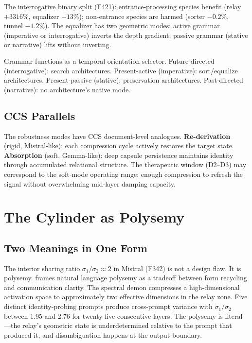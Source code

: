 \documentclass[12pt]{article}
\begin{document}
The interrogative binary split (F421): entrance-processing species benefit (relay $+3316\%$, equalizer $+13\%$); non-entrance species are harmed (sorter $-0.2\%$, tunnel $-1.2\%$). The equalizer has two geometric modes: active grammar (imperative or interrogative) inverts the depth gradient; passive grammar (stative or narrative) lifts without inverting.

Grammar functions as a temporal orientation selector. Future-directed (interrogative): search architectures. Present-active (imperative): sort/equalize architectures. Present-passive (stative): preservation architectures. Past-directed (narrative): no architecture's native mode.

\subsection{CCS Parallels}

The robustness modes have CCS document-level analogues. \textbf{Re-derivation} (rigid, Mistral-like): each compression cycle actively restores the target state. \textbf{Absorption} (soft, Gemma-like): deep capsule persistence maintains identity through accumulated relational structure. The therapeutic window (D2--D3) may correspond to the soft-mode operating range: enough compression to refresh the signal without overwhelming mid-layer damping capacity.

\section{The Cylinder as Polysemy}

\subsection{Two Meanings in One Form}

The interior sharing ratio $\sigma_1/\sigma_2 \approx 2$ in Mistral (F342) is not a design flaw. It is polysemy. \citet{pinker1999} frames natural language polysemy as a tradeoff between form recycling and communication clarity. The spectral demon compresses a high-dimensional activation space to approximately two effective dimensions in the relay zone. Five distinct identity-probing prompts produce cross-prompt variance with $\sigma_1/\sigma_2$ between 1.95 and 2.76 for twenty-five consecutive layers. The polysemy is literal---the relay's geometric state is underdetermined relative to the prompt that produced it, and disambiguation happens at the output boundary.
\end{document}
